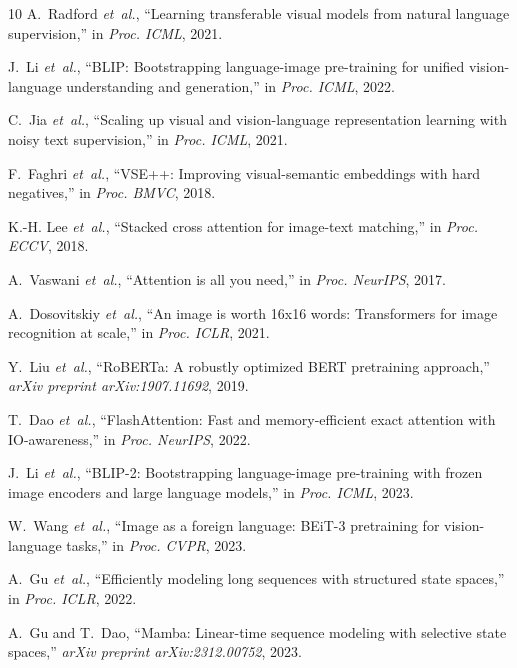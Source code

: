 \documentclass[11pt,journal,onecolumn,draftcls]{IEEEtran}
\begin{document}

\begin{thebibliography}{10}
A.~Radford \emph{et~al.}, ``Learning transferable visual models from natural language supervision,'' in \emph{Proc. ICML}, 2021.

J.~Li \emph{et~al.}, ``BLIP: Bootstrapping language-image pre-training for unified vision-language understanding and generation,'' in \emph{Proc. ICML}, 2022.

C.~Jia \emph{et~al.}, ``Scaling up visual and vision-language representation learning with noisy text supervision,'' in \emph{Proc. ICML}, 2021.

F.~Faghri \emph{et~al.}, ``VSE++: Improving visual-semantic embeddings with hard negatives,'' in \emph{Proc. BMVC}, 2018.

K.-H. Lee \emph{et~al.}, ``Stacked cross attention for image-text matching,'' in \emph{Proc. ECCV}, 2018.

A.~Vaswani \emph{et~al.}, ``Attention is all you need,'' in \emph{Proc. NeurIPS}, 2017.

A.~Dosovitskiy \emph{et~al.}, ``An image is worth 16x16 words: Transformers for image recognition at scale,'' in \emph{Proc. ICLR}, 2021.

Y.~Liu \emph{et~al.}, ``RoBERTa: A robustly optimized BERT pretraining approach,'' \emph{arXiv preprint arXiv:1907.11692}, 2019.

T.~Dao \emph{et~al.}, ``FlashAttention: Fast and memory-efficient exact attention with IO-awareness,'' in \emph{Proc. NeurIPS}, 2022.

J.~Li \emph{et~al.}, ``BLIP-2: Bootstrapping language-image pre-training with frozen image encoders and large language models,'' in \emph{Proc. ICML}, 2023.

W.~Wang \emph{et~al.}, ``Image as a foreign language: BEiT-3 pretraining for vision-language tasks,'' in \emph{Proc. CVPR}, 2023.

A.~Gu \emph{et~al.}, ``Efficiently modeling long sequences with structured state spaces,'' in \emph{Proc. ICLR}, 2022.

A.~Gu and T.~Dao, ``Mamba: Linear-time sequence modeling with selective state spaces,'' \emph{arXiv preprint arXiv:2312.00752}, 2023.


\end{thebibliography}
\end{document}
